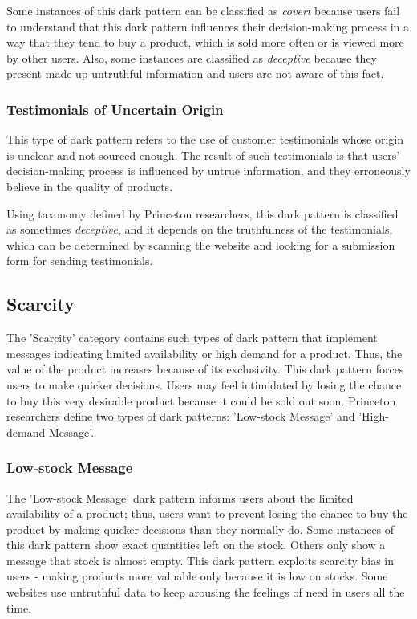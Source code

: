         Some instances of this dark pattern can be classified as \emph{covert} because users fail to understand that this dark pattern influences their decision-making process in a way that they tend to buy a product, which is sold more often or is viewed more by other users. Also, some instances are classified as \emph{deceptive} because they present made up untruthful information and users are not aware of this fact.
        \subsubsection*{Testimonials of Uncertain Origin}
        This type of dark pattern refers to the use of customer testimonials whose origin is unclear and not sourced enough. The result of such testimonials is that users' decision-making process is influenced by untrue information, and they erroneously believe in the quality of products.
        
        Using taxonomy defined by Princeton researchers, this dark pattern is classified as sometimes \emph{deceptive}, and it depends on the truthfulness of the testimonials, which can be determined by scanning the website and looking for a submission form for sending testimonials.
    \subsection{Scarcity}
    The 'Scarcity' category contains such types of dark pattern that implement messages indicating limited availability or high demand for a product. Thus, the value of the product increases because of its exclusivity. This dark pattern forces users to make quicker decisions. Users may feel intimidated by losing the chance to buy this very desirable product because it could be sold out soon. Princeton researchers define two types of dark patterns: 'Low-stock Message' and 'High-demand Message'.
        \subsubsection*{Low-stock Message}
        The 'Low-stock Message' dark pattern informs users about the limited availability of a product; thus, users want to prevent losing the chance to buy the product by making quicker decisions than they normally do. Some instances of this dark pattern show exact quantities left on the stock. Others only show a message that stock is almost empty. This dark pattern exploits scarcity bias in users - making products more valuable only because it is low on stocks. Some websites use untruthful data to keep arousing the feelings of need in users all the time.

